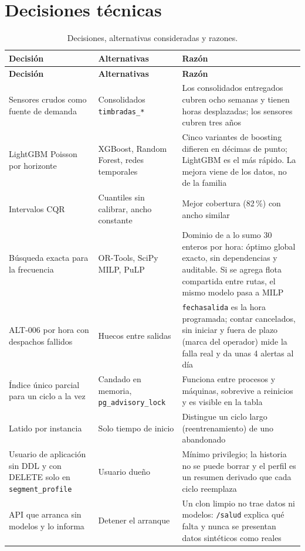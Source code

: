 \documentclass[10pt,a4paper]{article}
\newcommand{\cod}[1]{\texttt{\small #1}}
\begin{document}
\section{Decisiones técnicas}

\begin{longtable}{@{}p{}p{}p{}@{}}
\caption{Decisiones, alternativas consideradas y razones.}\\
\toprule
\textbf{Decisión} & \textbf{Alternativas} & \textbf{Razón} \\
\midrule
\endfirsthead
\toprule
\textbf{Decisión} & \textbf{Alternativas} & \textbf{Razón} \\
\midrule
\endhead
Sensores crudos como fuente de demanda & Consolidados \cod{timbradas\_*} & Los consolidados entregados cubren ocho semanas y tienen horas desplazadas; los sensores cubren tres años \\
LightGBM Poisson por horizonte & XGBoost, Random Forest, redes temporales & Cinco variantes de boosting difieren en décimas de punto; LightGBM es el más rápido. La mejora viene de los datos, no de la familia \\
Intervalos CQR & Cuantiles sin calibrar, ancho constante & Mejor cobertura (82\,\%) con ancho similar \\
Búsqueda exacta para la frecuencia & OR-Tools, SciPy MILP, PuLP & Dominio de a lo sumo 30 enteros por hora: óptimo global exacto, sin dependencias y auditable. Si se agrega flota compartida entre rutas, el mismo modelo pasa a MILP \\
ALT-006 por hora con despachos fallidos & Huecos entre salidas & \cod{fechasalida} es la hora programada; contar cancelados, sin iniciar y fuera de plazo (marca del operador) mide la falla real y da unas 4 alertas al día \\
Índice único parcial para un ciclo a la vez & Candado en memoria, \cod{pg\_advisory\_lock} & Funciona entre procesos y máquinas, sobrevive a reinicios y es visible en la tabla \\
Latido por instancia & Solo tiempo de inicio & Distingue un ciclo largo (reentrenamiento) de uno abandonado \\
Usuario de aplicación sin DDL y con DELETE solo en \cod{segment\_profile} & Usuario dueño & Mínimo privilegio; la historia no se puede borrar y el perfil es un resumen derivado que cada ciclo reemplaza \\
API que arranca sin modelos y lo informa & Detener el arranque & Un clon limpio no trae datos ni modelos: \cod{/salud} explica qué falta y nunca se presentan datos sintéticos como reales \\

\end{longtable}
\end{document}
